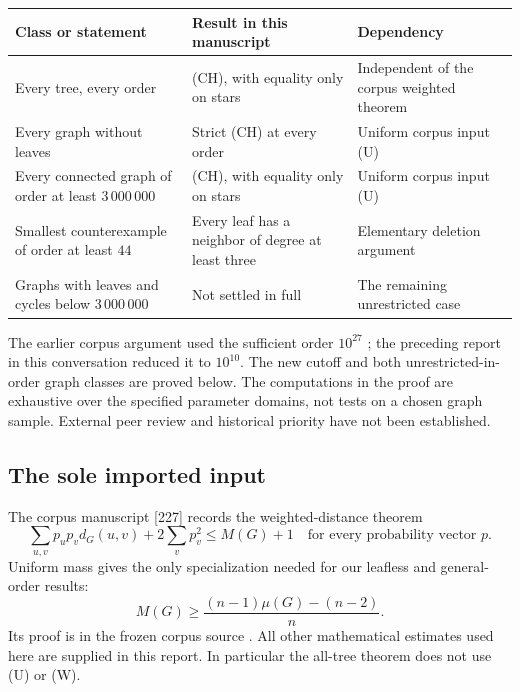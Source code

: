 \documentclass[11pt,a4paper]{article}
\theoremstyle{remark}
\numberwithin{equation}{section}
\begin{document}
\begin{center}\small
\begin{tabularx}{\linewidth}{@{}>{\raggedright\arraybackslash}p{.25\linewidth}
 X >{\raggedright\arraybackslash}p{.24\linewidth}@{}}
\toprule
Class or statement & Result in this manuscript & Dependency\\
\midrule
Every tree, every order & \textup{(CH)}, with equality only on stars &
Independent of the corpus weighted theorem\\
Every graph without leaves & Strict \textup{(CH)} at every order &
Uniform corpus input \textup{(U)}\\
Every connected graph of order at least $3\,000\,000$ &
\textup{(CH)}, with equality only on stars &
Uniform corpus input \textup{(U)}\\
Smallest counterexample of order at least $44$ &
Every leaf has a neighbor of degree at least three &
Elementary deletion argument\\
Graphs with leaves and cycles below $3\,000\,000$ &
Not settled in full & The remaining unrestricted case\\
\bottomrule
\end{tabularx}
\end{center}

The earlier corpus argument used the sufficient order $10^{27}$
\cite{vmrc227}; the preceding report in this conversation reduced it
to $10^{10}$. The new cutoff and both unrestricted-in-order graph
classes are proved below. The computations in the proof are exhaustive
over the specified parameter domains, not tests on a chosen graph sample.
External peer review and historical priority have not been established.

\subsection{The sole imported input}

The corpus manuscript [227] records the weighted-distance theorem
\[
 \sum_{u,v}p_up_vd_G(u,v)+2\sum_vp_v^2\le M(G)+1
 \quad\text{for every probability vector }p.
 \tag{W}\label{eq:W-new}
\]
Uniform mass gives the only specialization needed for our leafless
and general-order results:
\begin{equation}
 M(G)\ge\frac{(n-1)\mu(G)-(n-2)}n.
 \tag{U}\label{eq:U-new}
\end{equation}
Its proof is in the frozen corpus source \cite{vmrc227}.
All other mathematical estimates used here are supplied in this report.
In particular the all-tree theorem does not use \textup{(U)} or
\textup{(W)}.
\end{document}

